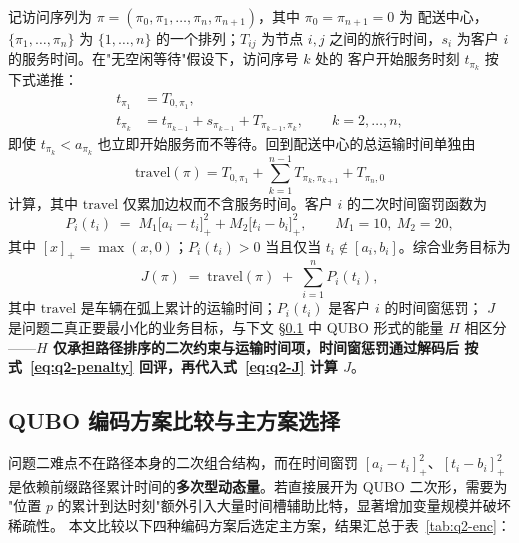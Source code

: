 \documentclass[UTF8,12pt,a4paper]{ctexart}
\begin{document}
记访问序列为 $\pi=(\pi_0,\pi_1,\dots,\pi_n,\pi_{n+1})$，其中 $\pi_0=\pi_{n+1}=0$ 为
配送中心，$\{\pi_1,\dots,\pi_n\}$ 为 $\{1,\dots,n\}$ 的一个排列；$T_{ij}$ 为节点 $i,j$
之间的旅行时间，$s_i$ 为客户 $i$ 的服务时间。在"无空闲等待"假设下，访问序号 $k$ 处的
客户开始服务时刻 $t_{\pi_k}$ 按下式递推：
\begin{align}
t_{\pi_1} &= T_{0,\pi_1},
   \label{eq:q2-t-first}\\[2pt]
t_{\pi_k} &= t_{\pi_{k-1}} + s_{\pi_{k-1}} + T_{\pi_{k-1},\pi_k},\qquad k=2,\dots,n,
   \label{eq:q2-t-rec}
\end{align}
即使 $t_{\pi_k} < a_{\pi_k}$ 也立即开始服务而不等待。回到配送中心的总运输时间单独由
\begin{equation}
\label{eq:q2-travel}
\mathrm{travel}(\pi) = T_{0,\pi_1} + \sum_{k=1}^{n-1} T_{\pi_k,\pi_{k+1}} + T_{\pi_n,0}
\end{equation}
计算，其中 $\mathrm{travel}$ 仅累加边权而不含服务时间。客户 $i$ 的二次时间窗罚函数为
\begin{equation}
\label{eq:q2-penalty}
P_i(t_i) \;=\; M_1\bigl[a_i - t_i\bigr]_{+}^{2} + M_2\bigl[t_i - b_i\bigr]_{+}^{2},\qquad
M_1 = 10,\ M_2 = 20,
\end{equation}
其中 $[x]_{+}=\max(x,0)$；$P_i(t_i)>0$ 当且仅当 $t_i \notin [a_i,b_i]$。综合业务目标为
\begin{equation}
\label{eq:q2-J}
J(\pi) \;=\; \mathrm{travel}(\pi) \;+\; \sum_{i=1}^{n} P_i(t_i),
\end{equation}
其中 $\mathrm{travel}$ 是车辆在弧上累计的运输时间；$P_i(t_i)$ 是客户 $i$ 的时间窗惩罚；
$J$ 是问题二真正要最小化的业务目标，与下文 §\ref{subsec:q2-enc} 中 QUBO 形式的能量
$H$ 相区分——\textbf{$H$ 仅承担路径排序的二次约束与运输时间项，时间窗惩罚通过解码后
按式~\eqref{eq:q2-penalty} 回评，再代入式~\eqref{eq:q2-J} 计算 $J$}。

\subsection{QUBO 编码方案比较与主方案选择}
\label{subsec:q2-enc}

问题二难点不在路径本身的二次组合结构，而在时间窗罚 $[a_i-t_i]_+^{2}$、$[t_i-b_i]_+^{2}$
是依赖前缀路径累计时间的\textbf{多次型动态量}。若直接展开为 QUBO 二次形，需要为
"位置 $p$ 的累计到达时刻"额外引入大量时间槽辅助比特，显著增加变量规模并破坏稀疏性。
本文比较以下四种编码方案后选定主方案，结果汇总于表~\ref{tab:q2-enc}：
\end{document}
